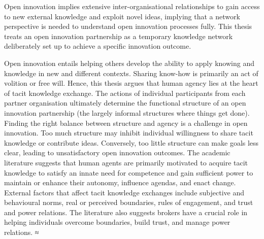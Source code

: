 \documentclass[12pt,table,xcdraw]{book}
\begin{document}
Open innovation implies extensive inter-organisational relationships to gain access to new external knowledge and exploit novel ideas, implying that a network perspective is needed to understand open innovation processes fully. This thesis treats an open innovation partnership as a temporary knowledge network deliberately set up to achieve a specific innovation outcome. \medskip

Open innovation entails helping others develop the ability to apply knowing and knowledge in new and different contexts. Sharing know-how is primarily an act of volition or free will. Hence, this thesis argues that human agency lies at the heart of tacit knowledge exchange. The actions of individual participants from each partner organisation ultimately determine the functional structure of an open innovation partnership (the largely informal structures where things get done). Finding the right balance between structure and agency is a challenge in open innovation. Too much structure may inhibit individual willingness to share tacit knowledge or contribute ideas. Conversely, too little structure can make goals less clear, leading to unsatisfactory open innovation outcomes. The academic literature suggests that human agents are primarily motivated to acquire tacit knowledge to satisfy an innate need for competence and gain sufficient power to maintain or enhance their autonomy, influence agendas, and enact change. External factors that affect tacit knowledge exchanges include subjective and behavioural norms, real or perceived boundaries, rules of engagement, and trust and power relations. The literature also suggests brokers have a crucial role in helping individuals overcome boundaries, build trust, and manage power relations. ≈\medskip
\end{document}
